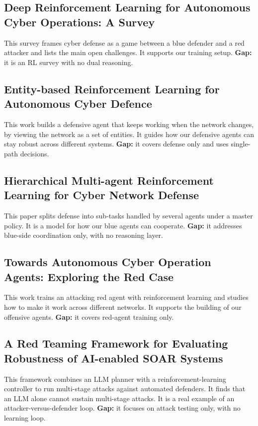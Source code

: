 \subsection{Deep Reinforcement Learning for Autonomous Cyber Operations: A Survey}
This survey frames cyber defense as a game between a blue defender and a red
attacker and lists the main open challenges. It supports our training setup.
\textbf{Gap:} it is an RL survey with no dual reasoning.

\subsection{Entity-based Reinforcement Learning for Autonomous Cyber Defence}
This work builds a defensive agent that keeps working when the network changes,
by viewing the network as a set of entities. It guides how our defensive agents
can stay robust across different systems. \textbf{Gap:} it covers defense only and
uses single-path decisions.

\subsection{Hierarchical Multi-agent Reinforcement Learning for Cyber Network Defense}
This paper splits defense into sub-tasks handled by several agents under a master
policy. It is a model for how our blue agents can cooperate. \textbf{Gap:} it
addresses blue-side coordination only, with no reasoning layer.

\subsection{Towards Autonomous Cyber Operation Agents: Exploring the Red Case}
This work trains an attacking red agent with reinforcement learning and studies
how to make it work across different networks. It supports the building of our
offensive agents. \textbf{Gap:} it covers red-agent training only.

\subsection{A Red Teaming Framework for Evaluating Robustness of AI-enabled SOAR Systems}
This framework combines an LLM planner with a reinforcement-learning controller
to run multi-stage attacks against automated defenders. It finds that an LLM
alone cannot sustain multi-stage attacks. It is a real example of an
attacker-versus-defender loop. \textbf{Gap:} it focuses on attack testing only,
with no learning loop.

